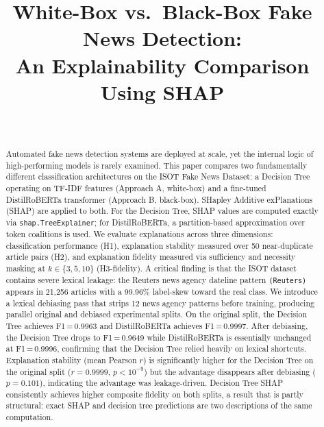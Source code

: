 \documentclass[journal,10pt,twocolumn]{IEEEtran}
\title{White-Box vs.\ Black-Box Fake News Detection:\\
  An Explainability Comparison Using SHAP}
\author{%
  \IEEEauthorblockN{Soham Sharma}\\
  \IEEEauthorblockA{Department of Computer Science\\
    Purdue University, West Lafayette, IN\\
    \texttt{sharm710@purdue.edu}}
}
\begin{document}
\maketitle

\begin{abstract}
Automated fake news detection systems are deployed at scale, yet the
internal logic of high-performing models is rarely examined.  This paper
compares two fundamentally different classification architectures on the
ISOT Fake News Dataset: a Decision Tree operating on TF-IDF features
(Approach A, white-box) and a fine-tuned DistilRoBERTa transformer
(Approach B, black-box).  SHapley Additive exPlanations (SHAP) are
applied to both.  For the Decision Tree, SHAP values are computed
exactly via \texttt{shap.TreeExplainer}; for DistilRoBERTa, a
partition-based approximation over token coalitions is used.  We
evaluate explanations across three dimensions: classification
performance (H1), explanation stability measured over 50 near-duplicate
article pairs (H2), and explanation fidelity measured via sufficiency
and necessity masking at $k \in \{3,5,10\}$ (H3-fidelity).  A
critical finding is that the ISOT dataset contains severe lexical
leakage: the Reuters news agency dateline pattern \texttt{(Reuters)}
appears in 21{,}256 articles with a 99.96\% label-skew toward the real
class.  We introduce a lexical debiasing pass that strips 12 news
agency patterns before training, producing parallel original and
debiased experimental splits.  On the original split, the Decision Tree
achieves F1\,=\,0.9963 and DistilRoBERTa achieves F1\,=\,0.9997.
After debiasing, the Decision Tree drops to F1\,=\,0.9649 while
DistilRoBERTa is essentially unchanged at F1\,=\,0.9996, confirming
that the Decision Tree relied heavily on lexical shortcuts.
Explanation stability (mean Pearson $r$) is significantly higher for
the Decision Tree on the original split ($r=0.9999$, $p < 10^{-9}$)
but the advantage disappears after debiasing ($p=0.101$), indicating
the advantage was leakage-driven.  Decision Tree SHAP consistently
achieves higher composite fidelity on both splits, a result that is
partly structural: exact SHAP and decision tree predictions are two
descriptions of the same computation.
\end{abstract}

\end{document}

